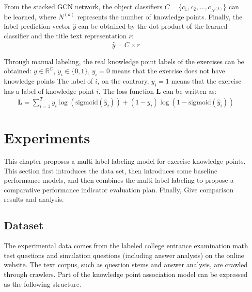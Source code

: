 From the stacked GCN network, the object classifiers \(C=\{c_1,c_2,\ldots,c_{N^{(k)}}\} \) can be learned, where \(N^{(k)}\) represents the number of knowledge points. Finally, the label prediction vector \(\hat{y}\) can be obtained by the dot product of the learned classifier and the title text representation \(r\):
\begin{align}
    \hat{y} = C\times r
\end{align}

Through manual labeling, the real knowledge point labels of the exercises can be obtained: \(y\in \mathbb{R}^C\), \(y_i\in \{0,1\} \), \(y_i=0\) means that the exercise does not have knowledge points The label of \(i\), on the contrary, \(y_i=1\) means that the exercise has a label of knowledge point \(i\). The loss function \(\mathbf{L}\) can be written as:
\begin{align}
    \mathbf{L}=\sum_{i=1}^{T} y_i \log (\text{sigmoid}(\hat{y}_i))+(1-y_i) \log (1-\text{sigmoid}(\hat{y}_i))
\end{align}

\section{Experiments}
This chapter proposes a multi-label labeling model for exercise knowledge points. This section first introduces the data set, then introduces some baseline performance models, and then combines the multi-label labeling to propose a comparative performance indicator evaluation plan. Finally, Give comparison results and analysis.
\subsection{Dataset}
The experimental data comes from the labeled college entrance examination math test questions and simulation questions (including answer analysis) on the online website. The text corpus, such as question stems and answer analysis, are crawled through crawlers. Part of the knowledge point association model can be expressed as the following structure.


